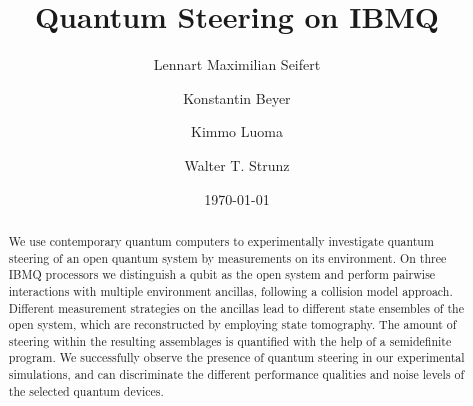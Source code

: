 \documentclass[aps,pra,twocolumn,superscriptaddress,showemail,showpacs,longbibliography]{revtex4-2}
\begin{document}

\title{Quantum Steering on IBMQ}

\author{Lennart Maximilian Seifert} 

\author{Konstantin Beyer} 

\author{Kimmo Luoma} 

\author{Walter T. Strunz}  

\date{\today}


\begin{abstract}
We use contemporary quantum computers to experimentally investigate quantum steering of an open quantum system by measurements on its environment. On three IBMQ processors we distinguish a qubit as the open system and perform pairwise interactions with multiple environment ancillas, following a collision model approach. Different measurement strategies on the ancillas lead to different state ensembles of the open system, which are reconstructed by employing state tomography. The amount of steering within the resulting assemblages is quantified with the help of a semidefinite program. We successfully observe the presence of quantum steering in our experimental simulations, and can discriminate the different performance qualities and noise levels of the selected quantum devices.
\end{abstract}


\pacs{}
\end{document}
